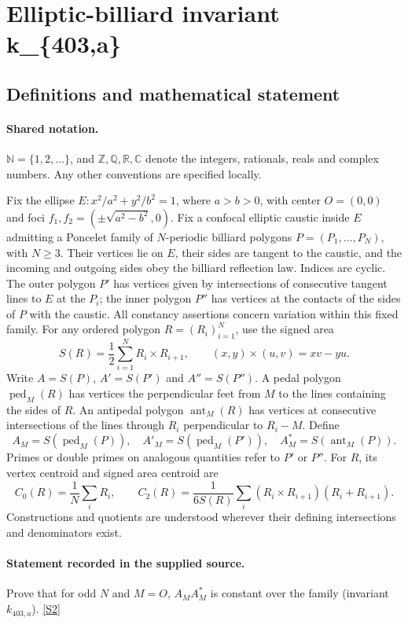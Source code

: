\documentclass[11pt]{article}
\newcommand{\sref}[2]{\hyperlink{source:#1:#2}{[S#2]}}
\begin{document}
\section{Elliptic-billiard invariant k\_\{403,a\}}\label{statement}

\subsection{Definitions and mathematical statement}

\paragraph{Shared notation.}$\mathbb N=\{1,2,\ldots\}$, and $\mathbb Z,\mathbb Q,\mathbb R,\mathbb C$ denote the integers, rationals, reals and complex numbers. Any other conventions are specified locally.


Fix the ellipse $E:x^2/a^2+y^2/b^2=1$, where $a>b>0$, with center $O=(0,0)$ and foci $f_1,f_2=(\pm\sqrt{a^2-b^2},0)$. Fix a confocal elliptic caustic inside $E$ admitting a Poncelet family of $N$-periodic billiard polygons $P=(P_1,\ldots,P_N)$, with $N\geq3$. Their vertices lie on $E$, their sides are tangent to the caustic, and the incoming and outgoing sides obey the billiard reflection law. Indices are cyclic. The outer polygon $P'$ has vertices given by intersections of consecutive tangent lines to $E$ at the $P_i$; the inner polygon $P''$ has vertices at the contacts of the sides of $P$ with the caustic. All constancy assertions concern variation within this fixed family.
For any ordered polygon $R=(R_i)_{i=1}^N$, use the signed area
\[S(R)=\frac12\sum_{i=1}^N R_i\times R_{i+1},\qquad (x,y)\times(u,v)=xv-yu.\]
Write $A=S(P)$, $A'=S(P')$ and $A''=S(P'')$. A pedal polygon $\operatorname{ped}_M(R)$ has vertices the perpendicular feet from $M$ to the lines containing the sides of $R$. An antipedal polygon $\operatorname{ant}_M(R)$ has vertices at consecutive intersections of the lines through $R_i$ perpendicular to $R_i-M$. Define
\[A_M=S(\operatorname{ped}_M(P)),\quad A'_M=S(\operatorname{ped}_M(P')),\quad A_M^*=S(\operatorname{ant}_M(P)).\]
Primes or double primes on analogous quantities refer to $P'$ or $P''$. For $R$, its vertex centroid and signed area centroid are
\[C_0(R)=\frac1N\sum_i R_i,\qquad C_2(R)=\frac{1}{6S(R)}\sum_i(R_i\times R_{i+1})(R_i+R_{i+1}).\]
Constructions and quotients are understood wherever their defining intersections and denominators exist.

\paragraph{Statement recorded in the supplied source.}
Prove that for odd $N$ and $M=O$, $A_MA_M^*$ is constant over the family (invariant $k_{403,a}$). \sref{statement}{2}
\end{document}
